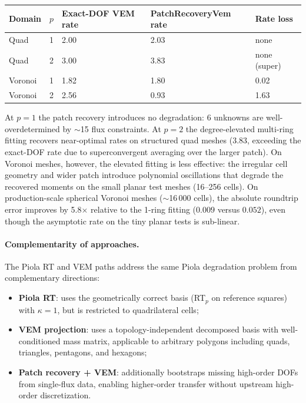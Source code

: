 \documentclass[11pt]{article}
\begin{document}
\begin{center}
\begin{tabular}{lllll}
\toprule
Domain & \(p\) & Exact-DOF VEM rate & PatchRecoveryVem rate & Rate loss \\
\midrule
Quad   & 1 & 2.00 & 2.03 & none \\
Quad   & 2 & 3.00 & 3.83 & none (super) \\
Voronoi & 1 & 1.82 & 1.80 & 0.02 \\
Voronoi & 2 & 2.56 & 0.93 & 1.63 \\
\bottomrule
\end{tabular}
\end{center}

At \(p=1\) the patch recovery introduces no degradation: 6 unknowns are
well-overdetermined by \(\sim\)15 flux constraints.  At \(p=2\) the
degree-elevated multi-ring fitting recovers near-optimal rates on structured
quad meshes (3.83, exceeding the exact-DOF rate due to superconvergent
averaging over the larger patch).  On Voronoi meshes, however, the elevated
fitting is less effective: the irregular cell geometry and wider patch
introduce polynomial oscillations that degrade the recovered moments on the
small planar test meshes (16--256 cells).  On production-scale spherical
Voronoi meshes (\(\sim\)16\,000 cells), the absolute roundtrip error
improves by 5.8\(\times\) relative to the 1-ring fitting
(\(0.009\) versus \(0.052\)), even though the asymptotic rate on the tiny
planar tests is sub-linear.

\paragraph{Complementarity of approaches.}
The Piola RT and VEM paths address the same Piola degradation problem from
complementary directions:
\begin{itemize}
  \item \textbf{Piola RT}: uses the geometrically correct basis (RT\(_p\) on
    reference squares) with \(\kappa=1\), but is restricted to quadrilateral
    cells;
  \item \textbf{VEM projection}: uses a topology-independent decomposed basis
    with well-conditioned mass matrix, applicable to arbitrary polygons
    including quads, triangles, pentagons, and hexagons;
  \item \textbf{Patch recovery + VEM}: additionally bootstraps missing
    high-order DOFs from single-flux data, enabling higher-order transfer
    without upstream high-order discretization.
\end{itemize}
\end{document}
